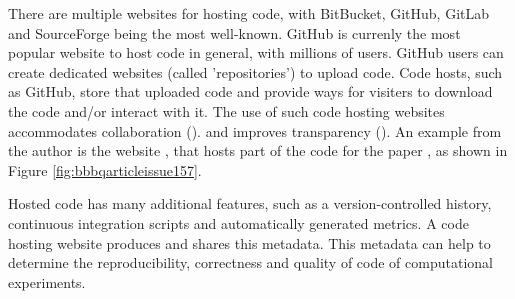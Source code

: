 
There are multiple websites for hosting code, with BitBucket, GitHub,
GitLab and SourceForge being the most well-known.
GitHub is currenly the most popular website to host code in general,
with millions of users.
GitHub users can create dedicated websites (called 'repositories')
to upload code. Code hosts, such as GitHub, 
store that uploaded code and provide ways 
for visiters to download the code and/or interact with it.
The use of such code hosting websites
accommodates collaboration (\cite{perez2016ten}).
and improves transparency (\cite{gorgolewski2016practical}).
An example from the author is the website \cite{bbbqarticleissue157},
that hosts part of the code for the paper \cite{bilderbeek2022transmembrane},
as shown in Figure \ref{fig:bbbqarticleissue157}.

Hosted code has many additional features, such as
a version-controlled history, continuous integration scripts
and automatically generated metrics.
A code hosting website produces and shares this metadata.
This metadata can help to determine the
reproducibility, correctness and quality of code
of computational experiments.

